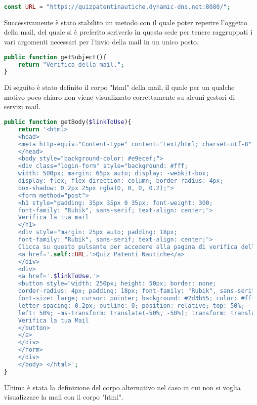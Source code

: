  \begin{lstlisting}[language=php]
	const URL = "https://quizpatentinautiche.dynamic-dns.net:8080/";
 \end{lstlisting}
 
  Successivamente è stato stabilito un metodo con il quale poter reperire l'oggetto della mail, del quale si è preferito scriverlo in questa sede per tenere raggruppati i vari argomenti necessari per l'invio della mail in un unico posto.\\
 
\begin{lstlisting}[language=php]
public function getSubject(){
	return "Verifica della mail.";
}
\end{lstlisting}

Di seguito è stato definito il corpo "html" della mail, il quale per un qualche motivo poco chiaro non viene visualizzato correttamente su alcuni gestori di servizi mail. \\

\begin{lstlisting}[language=php]
public function getBody($linkToUse){
	return '<html>
	<head>
	<meta http-equiv="Content-Type" content="text/html; charset=utf-8" />
	</head>
	<body style="background-color: #e9ecef;">
	<div class="login-form" style="background: #fff;
	width: 500px; margin: 65px auto; display: -webkit-box;
	display: flex; flex-direction: column; border-radius: 4px;
	box-shadow: 0 2px 25px rgba(0, 0, 0, 0.2);">
	<form method="post">
	<h1 style="padding: 35px 35px 0 35px; font-weight: 300;
	font-family: "Rubik", sans-serif; text-align: center;">
	Verifica la tua mail
	</h1>
	<div style="margin: 25px auto; padding: 18px;
	font-family: "Rubik", sans-serif; text-align: center;">
	Clicca su questo pulsante per accedere alla pagina di verifica della mail inserita su:
	<a href='.self::URL.'>Quiz Patenti Nautiche</a>
	</div>
	<div>
	<a href='.$linkToUse.'>
	<button style="width: 250px; height: 50px; border: none;
	border-radius: 4px; padding: 18px; font-family: "Rubik", sans-serif;
	font-size: large; cursor: pointer; background: #2d3b55; color: #fff;
	letter-spacing: 0.2px; outline: 0; position: relative; top: 50%;
	left: 50%; -ms-transform: translate(-50%, -50%); transform: translate(-50%, -50%);">
	Verifica la tua Mail
	</button>
	</a>
	</div>
	</form>
	</div>
	</body>	</html>';
}
 \end{lstlisting}
 
 Ultima è stata la definizione del corpo alternativo nel caso in cui non si voglia visualizzare la mail con il corpo "html".\\
 
